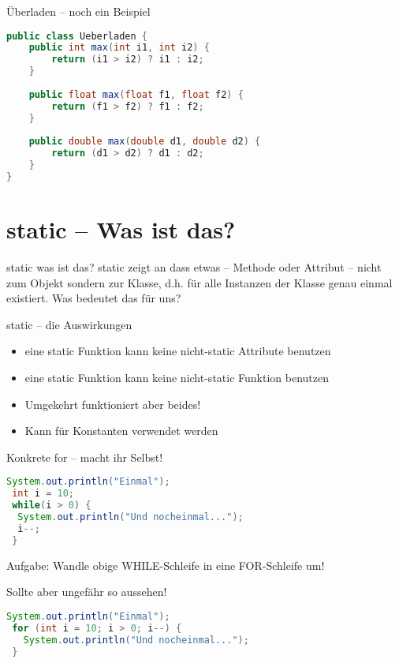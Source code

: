 \documentclass[18pt]{beamer}
\begin{document}
\begin{frame}[fragile]{Überladen – noch ein Beispiel}
 \begin{lstlisting}[language=java]
public class Ueberladen {
    public int max(int i1, int i2) { 
        return (i1 > i2) ? i1 : i2; 
    }
   
    public float max(float f1, float f2) { 
        return (f1 > f2) ? f1 : f2; 
    }
    
    public double max(double d1, double d2) { 
        return (d1 > d2) ? d1 : d2; 
    }
} 
 \end{lstlisting}
\end{frame}

\section{static – Was ist das?}
\begin{frame}{static was ist das?}
 static zeigt an dass etwas – Methode oder Attribut – nicht zum Objekt sondern zur Klasse, d.h. für alle Instanzen der Klasse genau einmal existiert.
 Was bedeutet das für uns?
\end{frame}

\begin{frame}{static – die Auswirkungen}
\begin{itemize}
 \item eine static Funktion kann keine nicht-static Attribute benutzen
 \item eine static Funktion kann keine nicht-static Funktion benutzen
 \item Umgekehrt funktioniert aber beides!
 \item Kann für Konstanten verwendet werden
\end{itemize}
 

\end{frame}


\begin{frame}[fragile]{Konkrete for – macht ihr Selbst!}
 \begin{lstlisting}[language=java]
 System.out.println("Einmal");
 int i = 10;
 while(i > 0) {
  System.out.println("Und nocheinmal...");
  i--;
 }
 \end{lstlisting}
 Aufgabe: Wandle obige WHILE-Schleife in eine FOR-Schleife um!
\end{frame}

\begin{frame}[fragile]{Sollte aber ungefähr so aussehen!}
 \begin{lstlisting}[language=java]
 System.out.println("Einmal");
 for (int i = 10; i > 0; i--) {
   System.out.println("Und nocheinmal...");
 }
 \end{lstlisting}
\end{frame}
\end{document}
